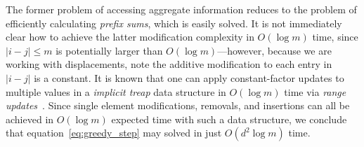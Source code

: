\documentclass[sn-mathphys]{sn-jnl}
\begin{document}
The former problem of accessing aggregate information reduces to the problem of efficiently calculating \emph{prefix sums}, which is easily solved. 
It is not immediately clear how to achieve the latter modification complexity in $O(\log m)$ time, since $\lvert i - j \rvert \leq m$ is potentially larger than $O(\log m)$---however, because we are working with displacements, note the additive modification to each entry in $\lvert i - j \rvert$ is a constant. It is known that one can apply constant-factor updates to multiple values in a \emph{implicit treap} data structure in $O(\log m)$ time via \emph{range updates}~\cite{blelloch1998fast}. 
Since single element modifications, removals, and insertions can all be achieved in $O(\log m)$ expected time with such a data structure, we conclude that equation~\eqref{eq:greedy_step} may solved in just $O(d^2 \log m)$ time. 

\end{document}

